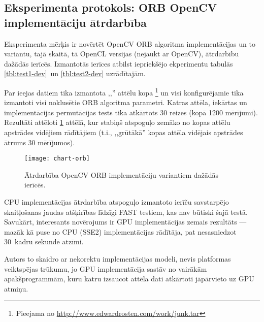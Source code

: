 \subsection{Eksperimenta protokols: ORB OpenCV implementāciju ātrdarbība}\label{appx:test4}
\setcounter{table}{0} %
\setcounter{figure}{0} %
Eksperimenta mērķis ir novērtēt OpenCV ORB algoritma implementācijas un
to variantu, tajā skaitā, tā OpenCL versijas (nejaukt ar OpenCV),
ātrdarbību dažādās ierīcēs.
Izmantotās ierīces atbilst iepriekšējo ekperimentu tabulās
\ref{tbl:test1-dev}~un \ref{tbl:test2-dev} uzrādītajām.

Par ieejas datiem tika izmantota ,,'' attēlu kopa%
	\footnote{Pieejama no \url{http://www.edwardrosten.com/work/junk.tar}}
un visi konfigurējamie tika izmantoti visi noklusētie ORB algoritma parametri.
Katras attēla, iekārtas un implementācijas permutācijas tests tika atkārtots
30 reizes (kopā 1200 mērījumi). Rezultāti attēloti \ref{fig:test4-data}
attēlā, kur stabiņš atspoguļo zemāko no kopas attēlu apstrādes vidējiem
rādītājiem
(t.i., ,,grūtākā'' kopas attēla vidējais apstrādes ātrums 30 mērījumos).

\begin{figure}[tbh]
	\centering
	\texttt{[image: chart-orb]}
	\caption{Ātrdarbība OpenCV ORB implementāciju variantiem dažādās ierīcēs.}
	\label{fig:test4-data}
\end{figure}

CPU implementācijas ātrdarbība atspoguļo izmantoto ierīču savstarpējo
skaitļošanas jaudas atšķirības līdzīgi FAST testiem, kas nav būtiski šajā
testā. Savukārt, interesants novērojums ir GPU implementācijas zemais
rezultāts --- mazāk kā puse no CPU (SSE2) implementācijas rādītāja, pat
nesasniedzot 30~kadru sekundē atzīmi.

Autors to skaidro ar nekorektu implementācijas modeli,
nevis platformas veiktspējas trūkumu, jo GPU implementācija sastāv no vairākām
apakšprogrammām, kuru katru izsaucot attēla dati atkārtoti jāpārvieto uz
GPU atmiņu.


